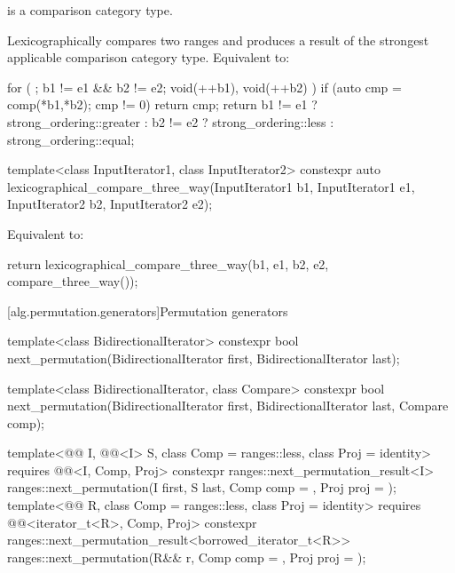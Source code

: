 \begin{itemdescr}
\pnum
\mandates
{} is a comparison category type.

\pnum
\effects
Lexicographically compares two ranges and
produces a result of the strongest applicable comparison category type.
Equivalent to:
\begin{codeblock}
for ( ; b1 != e1 && b2 != e2; void(++b1), void(++b2) )
  if (auto cmp = comp(*b1,*b2); cmp != 0)
    return cmp;
return b1 != e1 ? strong_ordering::greater :
       b2 != e2 ? strong_ordering::less :
                  strong_ordering::equal;
\end{codeblock}
\end{itemdescr}

%
\begin{itemdecl}
template<class InputIterator1, class InputIterator2>
  constexpr auto
    lexicographical_compare_three_way(InputIterator1 b1, InputIterator1 e1,
                                      InputIterator2 b2, InputIterator2 e2);
\end{itemdecl}

\begin{itemdescr}
\pnum
\effects
Equivalent to:
\begin{codeblock}
return lexicographical_compare_three_way(b1, e1, b2, e2, compare_three_way());
\end{codeblock}
\end{itemdescr}

[alg.permutation.generators]{Permutation generators}

%
\begin{itemdecl}
template<class BidirectionalIterator>
  constexpr bool next_permutation(BidirectionalIterator first,
                                  BidirectionalIterator last);

template<class BidirectionalIterator, class Compare>
  constexpr bool next_permutation(BidirectionalIterator first,
                                  BidirectionalIterator last, Compare comp);

template<@@ I, @@<I> S, class Comp = ranges::less,
         class Proj = identity>
  requires @@<I, Comp, Proj>
  constexpr ranges::next_permutation_result<I>
    ranges::next_permutation(I first, S last, Comp comp = {}, Proj proj = {});
template<@@ R, class Comp = ranges::less,
         class Proj = identity>
  requires @@<iterator_t<R>, Comp, Proj>
  constexpr ranges::next_permutation_result<borrowed_iterator_t<R>>
    ranges::next_permutation(R&& r, Comp comp = {}, Proj proj = {});
\end{itemdecl}


